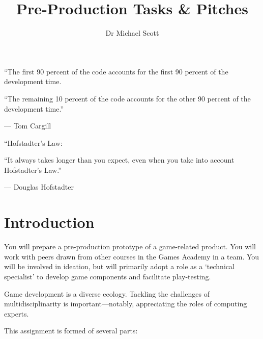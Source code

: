 \documentclass{../../fal_assignment}
\title{Pre-Production Tasks \& Pitches}
\author{Dr Michael Scott}
\begin{document}
\maketitle

\begin{marginquote}
    ``The first 90 percent of the code accounts for the first 90 percent of the development time.
    
    ``The remaining 10 percent of the code accounts for the other 90 percent of the development time.''
    
    --- Tom Cargill
    
    \marginquoterule
    
    ``Hofstadter's Law:
    
    ``It always takes longer than you expect, even when you take into account Hofstadter's Law.''
    
    --- Douglas Hofstadter
\end{marginquote}

\section*{Introduction}

You will prepare a pre-production prototype of a game-related product. You will work with peers drawn from other courses in the Games Academy in a team. You will be involved in ideation, but will primarily adopt a role as a `technical specialist' to develop game components and facilitate play-testing.

Game development is a diverse ecology. Tackling the challenges of multidisciplinarity is important---notably, appreciating the roles of computing experts.

This assignment is formed of several parts:
\end{document}
